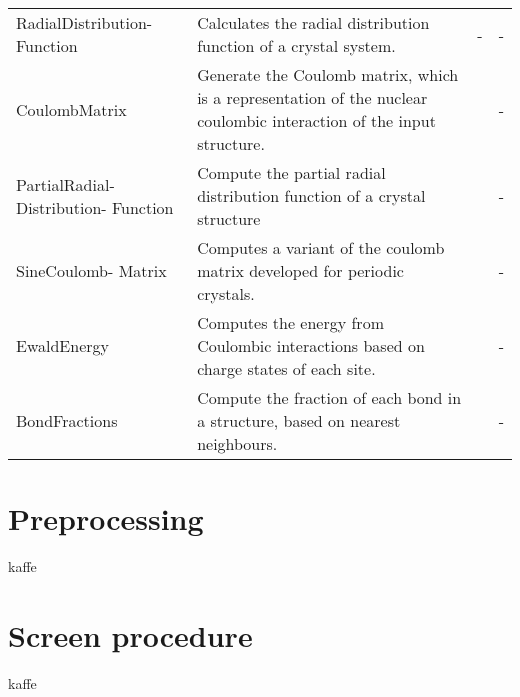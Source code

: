 \begin{center}
\begin{longtable}{M{3.0cm} M{3.5cm} M{2.5cm} M{2.5cm}}
  RadialDistribution- Function & Calculates the radial distribution function of a crystal system. & - & - \\
  CoulombMatrix & Generate the Coulomb matrix, which is a representation of the nuclear coulombic interaction of the input structure. & \cite{Rupp2012} & - \\
  PartialRadial- Distribution- Function & Compute the partial radial distribution function of a crystal structure & \cite{Schuett2014} & - \\
  SineCoulomb- Matrix & Computes a variant of the coulomb matrix developed for periodic crystals. & \cite{Faber2015} & - \\
  EwaldEnergy & Computes the energy from Coulombic interactions based on charge states of each site. & \cite{Ewald1921} & - \\
  BondFractions & Compute the fraction of each bond in a structure, based on nearest neighbours. & \cite{Hansen2015} & - \\
  \hline
\end{longtable}
\end{center}


\section{Preprocessing}
kaffe
\section{Screen procedure}
kaffe
